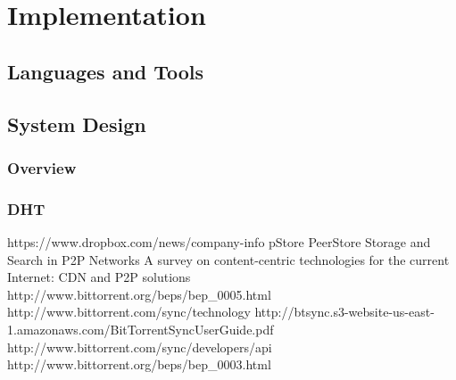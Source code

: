 \documentclass[a4paper]{article}
\begin{document}
\section{Implementation}
\subsection{Languages and Tools}
\subsection{System Design}
\subsubsection{Overview}
\subsubsection{}
\subsubsection{DHT}

\begin{thebibliography}{1}

 https://www.dropbox.com/news/company-info
 pStore
 PeerStore
 Storage and Search in P2P Networks
 A survey on content-centric technologies for the current Internet: CDN and P2P solutions
 http://www.bittorrent.org/beps/bep\_0005.html
 http://www.bittorrent.com/sync/technology
 http://btsync.s3-website-us-east-1.amazonaws.com/BitTorrentSyncUserGuide.pdf
 http://www.bittorrent.com/sync/developers/api
 http://www.bittorrent.org/beps/bep\_0003.html

\end{thebibliography}
\end{document}
